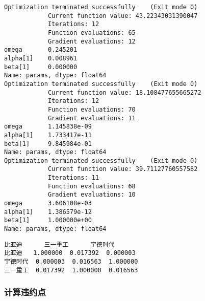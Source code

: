 \documentclass[11pt]{article}
\makeatletter
\newcommand{\boxspacing}{\kern\kvtcb@left@rule\kern\kvtcb@boxsep}
\newcommand{\prompt}[4]{
        {\ttfamily\llap{{\color{#2}[#3]:\hspace{3pt}#4}}\vspace{-\baselineskip}}
    }
\makeatother
\begin{document}
    \begin{Verbatim}[commandchars=\\\{\}]
Optimization terminated successfully    (Exit mode 0)
            Current function value: 43.22343031390047
            Iterations: 12
            Function evaluations: 65
            Gradient evaluations: 12
omega       0.245201
alpha[1]    0.008961
beta[1]     0.000000
Name: params, dtype: float64
Optimization terminated successfully    (Exit mode 0)
            Current function value: 18.108477655665272
            Iterations: 12
            Function evaluations: 70
            Gradient evaluations: 11
omega       1.145838e-09
alpha[1]    1.733417e-11
beta[1]     9.845984e-01
Name: params, dtype: float64
Optimization terminated successfully    (Exit mode 0)
            Current function value: 39.71127760557582
            Iterations: 11
            Function evaluations: 68
            Gradient evaluations: 10
omega       3.606108e-03
alpha[1]    1.386579e-12
beta[1]     1.000000e+00
Name: params, dtype: float64
    \end{Verbatim}

            \begin{tcolorbox}[breakable, size=fbox, boxrule=.5pt, pad at break*=1mm, opacityfill=0]
\prompt{Out}{outcolor}{5}{\boxspacing}
\begin{Verbatim}[commandchars=\\\{\}]
           比亚迪      三一重工      宁德时代
比亚迪   1.000000  0.017392  0.000003
宁德时代  0.000003  0.016563  1.000000
三一重工  0.017392  1.000000  0.016563
\end{Verbatim}
\end{tcolorbox}

    \hypertarget{ux8ba1ux7b97ux8fddux7ea6ux70b9}{%
\subsubsection{计算违约点}\label{ux8ba1ux7b97ux8fddux7ea6ux70b9}}
\end{document}
